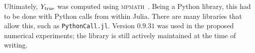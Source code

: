 %
%
%
%
%
%
%

Ultimately, $Y_{\textup{true}}$ was computed using \textsc{mpmath}~\cite{mpmath}. 
Being a Python library, this had to be done with Python calls from within Julia. There are many libraries that allow this, such as \texttt{PythonCall.jl}. Version $0.9.31$ was used in the proposed numerical experiments; the library is still actively maintained at the time of writing.

